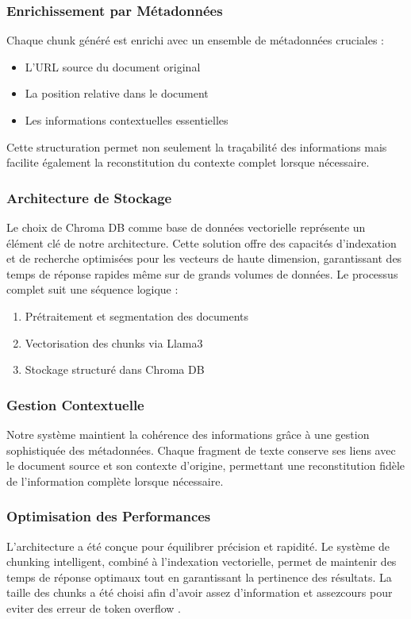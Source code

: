\documentclass{article}
\begin{document}
    \subsubsection{Enrichissement par Métadonnées}
    Chaque chunk généré est enrichi avec un ensemble de métadonnées cruciales :
    \begin{itemize}
        \item L'URL source du document original
        \item La position relative dans le document
        \item Les informations contextuelles essentielles
    \end{itemize}
    Cette structuration permet non seulement la traçabilité des informations mais facilite également la reconstitution du contexte complet lorsque nécessaire.
    
    \subsubsection{Architecture de Stockage}
    \quad Le choix de Chroma DB comme base de données vectorielle représente un élément clé de notre architecture. Cette solution offre des capacités d'indexation et de recherche optimisées pour les vecteurs de haute dimension, garantissant des temps de réponse rapides même sur de grands volumes de données. Le processus complet suit une séquence logique :
    \begin{enumerate}
        \item Prétraitement et segmentation des documents
        \item Vectorisation des chunks via Llama3
        \item Stockage structuré dans Chroma DB
    \end{enumerate}
    
    \subsubsection{Gestion Contextuelle}
    \quad Notre système maintient la cohérence des informations grâce à une gestion sophistiquée des métadonnées. Chaque fragment de texte conserve ses liens avec le document source et son contexte d'origine, permettant une reconstitution fidèle de l'information complète lorsque nécessaire.
    
    \subsubsection{Optimisation des Performances}
    \quad L'architecture a été conçue pour équilibrer précision et rapidité. Le système de chunking intelligent, combiné à l'indexation vectorielle, permet de maintenir des temps de réponse optimaux tout en garantissant la pertinence des résultats. La taille des chunks a été choisi afin d'avoir assez d'information et assezcours pour eviter des erreur de token overflow .
\end{document}
